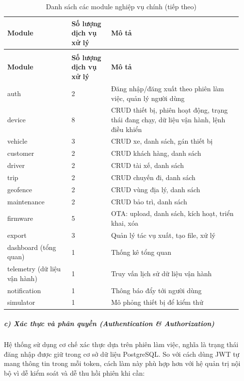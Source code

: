 \documentclass[a4paper]{extarticle}
\newcommand{\thesissettableid}[2]{%
  \renewcommand{\thetable}{#1}%
  \renewcommand{\theHtable}{#2}%
}
\begin{document}
{\thesissettableid{4.7}{tab-ch4-danh-sach-cac-domain-modules-chinh}
\def\LTcaptype{table}
\begin{longtable}{|L{0.263\linewidth}|L{0.162\linewidth}|L{0.539\linewidth}|}
\caption{Danh sách các module nghiệp vụ chính}\label{tab:ch4-danh-sach-cac-domain-modules-chinh}\\
\hline \textbf{Module} & \textbf{Số lượng dịch vụ xử lý} & \textbf{Mô tả} \\
\hline
\endfirsthead
\caption[]{Danh sách các module nghiệp vụ chính (tiếp theo)}\\
\hline \textbf{Module} & \textbf{Số lượng dịch vụ xử lý} & \textbf{Mô tả} \\
\hline
\endhead
\hline
\endfoot
\endlastfoot
auth & 2 & Đăng nhập/đăng xuất theo phiên làm việc, quản lý người dùng \\\hline
device & 8 & CRUD thiết bị, phiên hoạt động, trạng thái đang chạy, dữ liệu vận hành, lệnh
điều khiển \\\hline
vehicle & 3 & CRUD xe, danh sách, gán thiết bị \\\hline
customer & 2 & CRUD khách hàng, danh sách \\\hline
driver & 2 & CRUD tài xế, danh sách \\\hline
trip & 2 & CRUD chuyến đi, danh sách \\\hline
geofence & 2 & CRUD vùng địa lý, danh sách \\\hline
maintenance & 2 & CRUD bảo trì, danh sách \\\hline
firmware & 5 & OTA: upload, danh sách, kích hoạt, triển khai, xóa \\\hline
export & 3 & Quản lý tác vụ xuất, tạo file, xử lý \\\hline
dashboard (tổng quan) & 1 & Thống kê tổng quan \\\hline
telemetry (dữ liệu vận hành) & 1 & Truy vấn lịch sử dữ liệu vận hành \\\hline
notification & 1 & Thông báo đẩy tới người dùng \\\hline
simulator & 1 & Mô phỏng thiết bị để kiểm thử \\\hline
\end{longtable}
}


\subparagraph{c) Xác thực và phân quyền (Authentication \&
Authorization)}\label{c-xuxe1c-thux1ef1c-vuxe0-phuxe2n-quyux1ec1n-authentication--authorization}

Hệ thống sử dụng cơ chế xác thực dựa trên phiên làm việc, nghĩa là trạng
thái đăng nhập được giữ trong cơ sở dữ liệu PostgreSQL. So với cách dùng
JWT tự mang thông tin trong mỗi token, cách làm này phù hợp hơn với hệ
quản trị nội bộ vì dễ kiểm soát và dễ thu hồi phiên khi cần:
\end{document}
